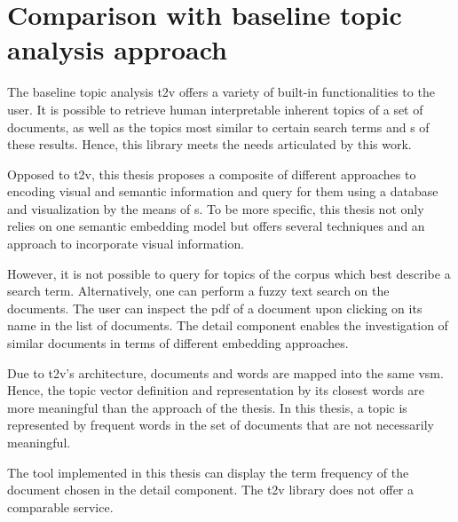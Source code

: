 \section{Comparison with baseline topic analysis approach}\label{sec:evaluation-top-model-app}

The baseline topic analysis \ac{t2v} offers a variety of built-in functionalities to the user.
It is possible to retrieve human interpretable inherent topics of a set of documents, 
as well as the topics most similar to certain search terms 
and \wordcloud{}s of these results.
Hence, this library meets the needs articulated by this work.

Opposed to \ac{t2v}, this thesis proposes a composite of different approaches to encoding visual and semantic information 
and query for them using a database and visualization by the means of \wordcloud{}s.
To be more specific, this thesis not only relies on one semantic embedding model but offers several techniques and an approach to incorporate visual information.

However, it is not possible to query for topics of the corpus which best describe a search term.
Alternatively, one can perform a fuzzy text search on the documents.
The user can inspect the \ac{pdf} of a document upon clicking on its name in the list of documents.
The detail component enables the investigation of similar documents in terms of different embedding approaches.

Due to \ac{t2v}'s architecture, documents and words are mapped into the same \ac{vsm}.
Hence, the topic vector definition and representation by its closest words are more meaningful than the approach of the thesis. 
In this thesis, a topic is represented by frequent words in the set of documents that are not necessarily meaningful. 

The tool implemented in this thesis can display the term frequency of the document chosen in the detail component.
The \ac{t2v} library does not offer a comparable service.